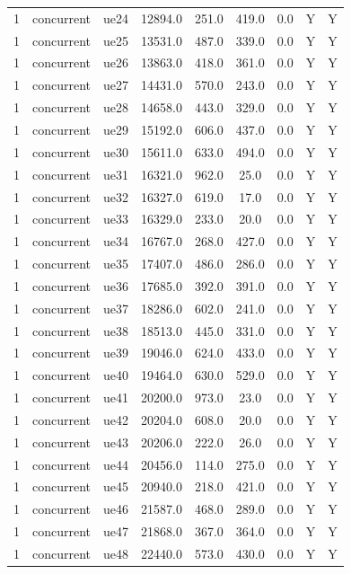 \begin{table}[ht]
\begin{tabular}{|c|c|c|c|c|c|c|c|c|}
1 & concurrent & ue24 & 12894.0 & 251.0 & 419.0 & 0.0 & Y & Y \\
1 & concurrent & ue25 & 13531.0 & 487.0 & 339.0 & 0.0 & Y & Y \\
1 & concurrent & ue26 & 13863.0 & 418.0 & 361.0 & 0.0 & Y & Y \\
1 & concurrent & ue27 & 14431.0 & 570.0 & 243.0 & 0.0 & Y & Y \\
1 & concurrent & ue28 & 14658.0 & 443.0 & 329.0 & 0.0 & Y & Y \\
1 & concurrent & ue29 & 15192.0 & 606.0 & 437.0 & 0.0 & Y & Y \\
1 & concurrent & ue30 & 15611.0 & 633.0 & 494.0 & 0.0 & Y & Y \\
1 & concurrent & ue31 & 16321.0 & 962.0 & 25.0 & 0.0 & Y & Y \\
1 & concurrent & ue32 & 16327.0 & 619.0 & 17.0 & 0.0 & Y & Y \\
1 & concurrent & ue33 & 16329.0 & 233.0 & 20.0 & 0.0 & Y & Y \\
1 & concurrent & ue34 & 16767.0 & 268.0 & 427.0 & 0.0 & Y & Y \\
1 & concurrent & ue35 & 17407.0 & 486.0 & 286.0 & 0.0 & Y & Y \\
1 & concurrent & ue36 & 17685.0 & 392.0 & 391.0 & 0.0 & Y & Y \\
1 & concurrent & ue37 & 18286.0 & 602.0 & 241.0 & 0.0 & Y & Y \\
1 & concurrent & ue38 & 18513.0 & 445.0 & 331.0 & 0.0 & Y & Y \\
1 & concurrent & ue39 & 19046.0 & 624.0 & 433.0 & 0.0 & Y & Y \\
1 & concurrent & ue40 & 19464.0 & 630.0 & 529.0 & 0.0 & Y & Y \\
1 & concurrent & ue41 & 20200.0 & 973.0 & 23.0 & 0.0 & Y & Y \\
1 & concurrent & ue42 & 20204.0 & 608.0 & 20.0 & 0.0 & Y & Y \\
1 & concurrent & ue43 & 20206.0 & 222.0 & 26.0 & 0.0 & Y & Y \\
1 & concurrent & ue44 & 20456.0 & 114.0 & 275.0 & 0.0 & Y & Y \\
1 & concurrent & ue45 & 20940.0 & 218.0 & 421.0 & 0.0 & Y & Y \\
1 & concurrent & ue46 & 21587.0 & 468.0 & 289.0 & 0.0 & Y & Y \\
1 & concurrent & ue47 & 21868.0 & 367.0 & 364.0 & 0.0 & Y & Y \\
1 & concurrent & ue48 & 22440.0 & 573.0 & 430.0 & 0.0 & Y & Y \\

\end{tabular}
\end{table}
